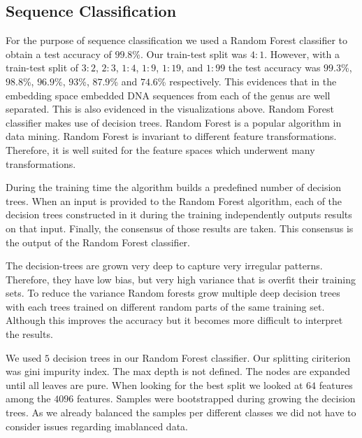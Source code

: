 \documentclass[oneside, twocolumn, a4paper, 10pt]{IEEEtran}
\begin{document}
\subsection{Sequence Classification}
For the purpose of sequence classification we used a Random Forest classifier to obtain a test accuracy of $99.8$\%. Our train-test split was $4:1$. However, with a train-test split of $3:2$, $2:3$, $1:4$, $1:9$, $1:19$, and $1:99$ the test accuracy was $99.3$\%, $98.8$\%, $96.9$\%, $93$\%, $87.9$\% and $74.6$\% respectively. This evidences that in the embedding space embedded DNA sequences from each of the genus are well separated. This is also evidenced in the visualizations above. Random Forest classifier makes use of decision trees. Random Forest is a popular algorithm in data mining. Random Forest is invariant to different feature transformations. Therefore, it is well suited for the feature spaces which underwent many transformations.\\
\par
During the training time the algorithm builds a predefined number of decision trees. When an input is provided to the Random Forest algorithm, each of the decision trees constructed in it during the training independently outputs results on that input. Finally, the consensus of those results are taken. This consensus is the output of the Random Forest classifier.\\
\par 
The decision-trees are grown very deep to capture very irregular patterns. Therefore, they have low bias, but very high variance that is overfit their training sets. To reduce the variance Random forests grow multiple deep decision trees with each trees trained on different random parts of the same training set. Although this improves the accuracy but it becomes more difficult to interpret the results.\\
\par 
We used $5$ decision trees in our Random Forest classifier. Our splitting ciriterion was gini impurity index. The max depth is not defined. The nodes are expanded until all leaves are pure. When looking for the best split we looked at $64$ features among the $4096$ features. Samples were bootstrapped during growing the decision trees. As we already balanced the samples per different classes we did not have to consider issues regarding imablanced data. 
\end{document}
